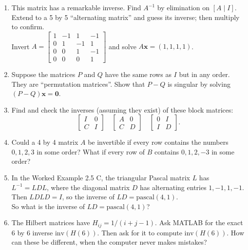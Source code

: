 \documentclass[14pt, a4paper]{article}
\begin{document}
\begin{enumerate}[resume]
    \item This matrix has a remarkable inverse. Find $A^{-1}$ by elimination on $[A\mid I]$. Extend to a 5 by 5 ``alternating matrix'' and guess its inverse; then multiply to confirm.\\
          Invert $A = \begin{bmatrix} 1 & -1 & 1 & -1 \\ 0 & 1 & -1 & 1 \\ 0 & 0 & 1 & -1 \\ 0 & 0 & 0 & 1 \end{bmatrix}$ and solve $A\boldsymbol{x} = (1,1,1,1)$.

    \item Suppose the matrices $P$ and $Q$ have the same rows as $I$ but in any order. They are ``permutation matrices''. Show that $P-Q$ is singular by solving $(P-Q)\boldsymbol{x} = \boldsymbol{0}$.

    \item Find and check the inverses (assuming they exist) of these block matrices:
          \[
              \begin{bmatrix} I & 0 \\ C & I \end{bmatrix}
              \quad
              \begin{bmatrix} A & 0 \\ C & D \end{bmatrix}
              \quad
              \begin{bmatrix} 0 & I \\ I & D \end{bmatrix}.
          \]

    \item Could a 4 by 4 matrix $A$ be invertible if every row contains the numbers $0,1,2,3$ in some order? What if every row of $B$ contains $0,1,2,-3$ in some order?

    \item In the Worked Example 2.5 C, the triangular Pascal matrix $L$ has $L^{-1} = LDL$, where the diagonal matrix $D$ has alternating entries $1,-1,1,-1$. Then $LDL D = I$, so the inverse of $LD = \text{pascal}(4,1)$.\\
          So what is the inverse of $LD = \text{pascal}(4,1)$?

    \item The Hilbert matrices have $H_{ij} = 1/(i+j-1)$. Ask \textcolor{blue!60!white}{MATLAB} for the exact 6 by 6 inverse $\text{inv}(H(6))$. Then ask for it to compute $\text{inv}(H(6))$. How can these be different, when the computer never makes mistakes?


\end{enumerate}
\end{document}
